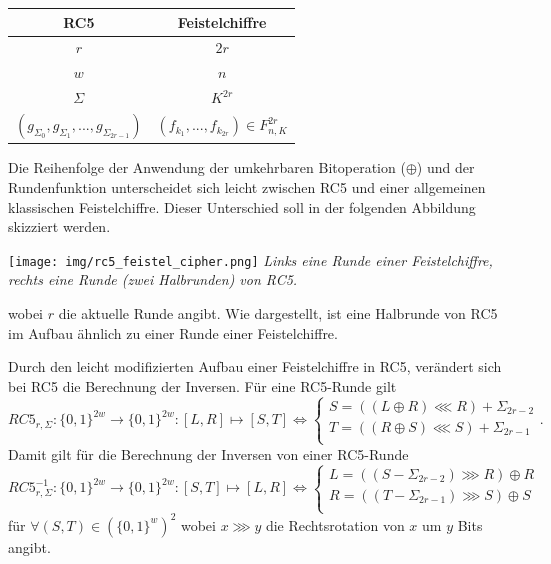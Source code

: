 \documentclass[course=erap]{aspdoc}
\begin{document}
\begin{center}
 \begin{tabular}{c|c}
 RC5 & Feistelchiffre \\
 \hline
 $r$ & $2r$ \\
 $w$ & $n$ \\
 $\Sigma$ & $K^{2r}$ \\
 $(g_{\Sigma_0}, g_{\Sigma_1}, ..., g_{\Sigma_{2r-1}})$ & $(f_{k_1}, ..., f_{k_{2r}}) \in F^{2r}_{n, K}$ \\
\end{tabular}
\end{center}

Die Reihenfolge der Anwendung der umkehrbaren Bitoperation ($\oplus$) und der Rundenfunktion unterscheidet sich leicht zwischen RC5 und einer allgemeinen klassischen Feistelchiffre. Dieser Unterschied soll in der folgenden Abbildung skizziert werden.

\begin{samepage}
\begin{center}
    \texttt{[image: img/rc5\_feistel\_cipher.png]}\break
    \textit{Links eine Runde einer Feistelchiffre, rechts eine Runde (zwei Halbrunden) von RC5.}
\end{center}
\end{samepage}

wobei $r$ die aktuelle Runde angibt. Wie dargestellt, ist eine Halbrunde von RC5 im Aufbau ähnlich zu einer Runde einer Feistelchiffre.\bigbreak

Durch den leicht modifizierten Aufbau einer Feistelchiffre in RC5, verändert sich bei RC5 die Berechnung der Inversen. Für eine RC5-Runde gilt
\[
    RC5_{r, \Sigma} \colon \{0, 1\}^{2w} \to \{0, 1\}^{2w} \colon [L, R] \mapsto [S, T] \Leftrightarrow
        \begin{cases}
            S = ((L \oplus R) \lll R) + \Sigma_{2r-2} \\
            T = ((R \oplus S) \lll S) + \Sigma_{2r-1} \\
        \end{cases}.
\]
Damit gilt für die Berechnung der Inversen von einer RC5-Runde
\[
    RC5_{r, \Sigma}^{-1} \colon \{0, 1\}^{2w} \to \{0, 1\}^{2w} \colon [S, T] \mapsto [L, R] \Leftrightarrow
        \begin{cases}
            L = ((S - \Sigma_{2r-2}) \ggg R) \oplus R \\
            R = ((T - \Sigma_{2r-1}) \ggg S) \oplus S \\
        \end{cases}
\]
für $\forall(S, T) \in (\{0, 1\}^w)^2$ wobei $x \ggg y$ die Rechtsrotation von $x$ um $y$ Bits angibt.
\end{document}
